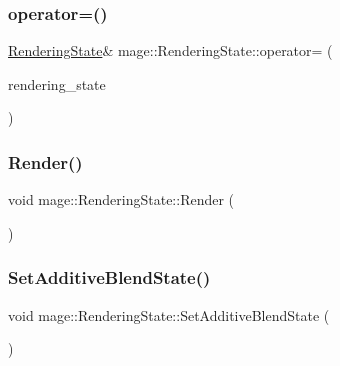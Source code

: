 \hypertarget{structmage_1_1_rendering_state_ad16e9963683b1eda6cbe675b8b210368}{}\label{structmage_1_1_rendering_state_ad16e9963683b1eda6cbe675b8b210368} 
\subsubsection{\texorpdfstring{operator=()}{operator=()}\hspace{0.1cm}{\footnotesize\ttfamily [2/2]}}
{\footnotesize\ttfamily \hyperlink{structmage_1_1_rendering_state}{Rendering\+State}\& mage\+::\+Rendering\+State\+::operator= (\begin{DoxyParamCaption}\item[{\hyperlink{structmage_1_1_rendering_state}{Rendering\+State} \&\&}]{rendering\+\_\+state }\end{DoxyParamCaption})\hspace{0.3cm}{\ttfamily [delete]}}

\hypertarget{structmage_1_1_rendering_state_a0a95ff66f5a136aceab2b7836c4d220c}{}\label{structmage_1_1_rendering_state_a0a95ff66f5a136aceab2b7836c4d220c} 
\subsubsection{\texorpdfstring{Render()}{Render()}}
{\footnotesize\ttfamily void mage\+::\+Rendering\+State\+::\+Render (\begin{DoxyParamCaption}{ }\end{DoxyParamCaption})}

\hypertarget{structmage_1_1_rendering_state_a61341d0fc7f1140faaf8fb33f9bb13fb}{}\label{structmage_1_1_rendering_state_a61341d0fc7f1140faaf8fb33f9bb13fb} 
\subsubsection{\texorpdfstring{Set\+Additive\+Blend\+State()}{SetAdditiveBlendState()}}
{\footnotesize\ttfamily void mage\+::\+Rendering\+State\+::\+Set\+Additive\+Blend\+State (\begin{DoxyParamCaption}{ }\end{DoxyParamCaption})}

